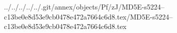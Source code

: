 ../../../../../.git/annex/objects/Pf/zJ/MD5E-s5224--c13be0e8d53e9cb0478e472a7664c6d8.tex/MD5E-s5224--c13be0e8d53e9cb0478e472a7664c6d8.tex
